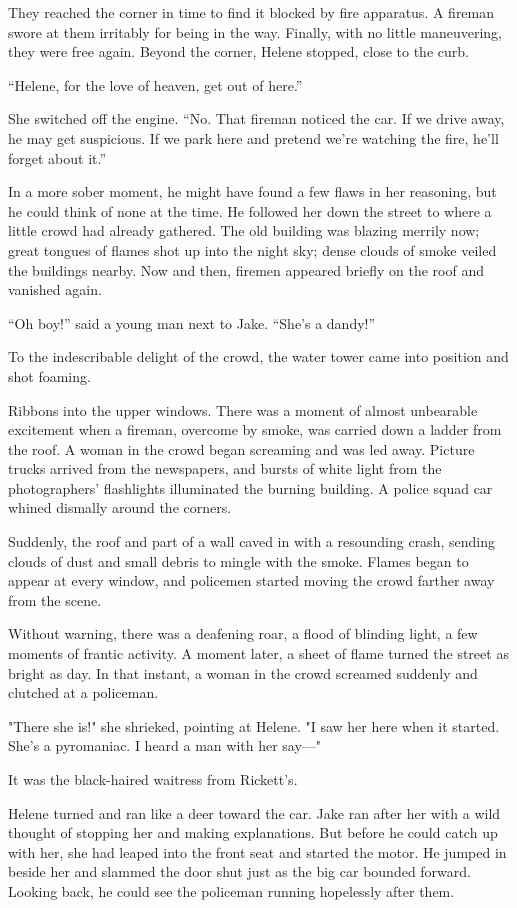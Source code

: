 \documentclass{novel}
\begin{document}
They reached the corner in time to find it blocked by fire apparatus. A fireman swore at them irritably for being in the way. Finally, with no little maneuvering, they were free again. Beyond the corner, Helene stopped, close to the curb.

“Helene, for the love of heaven, get out of here.”

She switched off the engine. “No. That fireman noticed the car. If we drive away, he may get suspicious. If we park here and pretend we’re watching the fire, he’ll forget about it.”

In a more sober moment, he might have found a few flaws in her reasoning, but he could think of none at the time. He followed her down the street to where a little crowd had already gathered. The old building was blazing merrily now; great tongues of flames shot up into the night sky; dense clouds of smoke veiled the buildings nearby. Now and then, firemen appeared briefly on the roof and vanished again.

“Oh boy!” said a young man next to Jake. “She’s a dandy!”

To the indescribable delight of the crowd, the water tower came into position and shot foaming.

Ribbons into the upper windows. There was a moment of almost unbearable excitement when a fireman, overcome by smoke, was carried down a ladder from the roof. A woman in the crowd began screaming and was led away. Picture trucks arrived from the newspapers, and bursts of white light from the photographers' flashlights illuminated the burning building. A police squad car whined dismally around the corners.

Suddenly, the roof and part of a wall caved in with a resounding crash, sending clouds of dust and small debris to mingle with the smoke. Flames began to appear at every window, and policemen started moving the crowd farther away from the scene.

Without warning, there was a deafening roar, a flood of blinding light, a few moments of frantic activity. A moment later, a sheet of flame turned the street as bright as day. In that instant, a woman in the crowd screamed suddenly and clutched at a policeman.

"There she is!" she shrieked, pointing at Helene. "I saw her here when it started. She's a pyromaniac. I heard a man with her say—"

It was the black-haired waitress from Rickett's.

Helene turned and ran like a deer toward the car. Jake ran after her with a wild thought of stopping her and making explanations. But before he could catch up with her, she had leaped into the front seat and started the motor. He jumped in beside her and slammed the door shut just as the big car bounded forward. Looking back, he could see the policeman running hopelessly after them.
\end{document}
